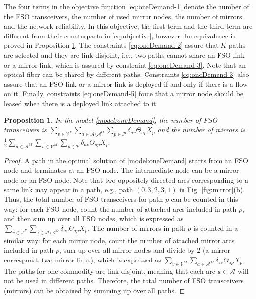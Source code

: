 \documentclass[onecolumn,11pt,draftclsnofoot]{IEEEtran}
\newtheorem{proposition}{Proposition}
\begin{document}
The four terms in the objective function \eqref{eq:oneDemand-1} denote the number of the FSO transceivers,  the number of used mirror nodes, the number of mirrors and the network reliability. In this objective, the first term and the third term are different from their counterparts in \eqref{eq:objective}, however the equivalence is proved in Proposition \ref{pp:oneDemand}.
The constraints \eqref{eq:oneDemand-2} assure that $K$ paths are selected and they are link-disjoint, i.e., two paths cannot share an FSO link or a mirror link, which is assured by constraint \eqref{eq:oneDemand-3}. Note that an optical fiber can be shared by different paths.
Constraints \eqref{eq:oneDemand-3} also assure that an FSO link or a mirror link is deployed if and only if there is a flow on it. Finally, constraints \eqref{eq:oneDemand-5} force that a mirror node should be leased when there is a deployed link attached to it.

\begin{proposition}\label{pp:oneDemand}
In the model \eqref{model:oneDemand}, the number of FSO transceivers is $\sum_{v \in \mathcal V^F}  \sum_{a \in  \mathcal A \setminus \mathcal A^O} \sum_{p \in \mathcal P}  \delta_{av} \Theta_{ap} X_{p} $ and the number of mirrors is $\frac{1}{2} \sum_{a \in \mathcal A^M}\sum_{v \in \mathcal V^M} \sum_{p \in \mathcal P}  \delta_{av} \Theta_{ap} X_p$. 
\end{proposition}
\begin{proof}
A path in the optimal solution of \eqref{model:oneDemand} starts from an FSO node and terminates at an FSO node. The intermediate node can be a mirror node or an FSO node. Note that two oppositely directed arcs corresponding to a same link may appear in a path, e.g., path $(0,3,2,3,1)$ in Fig. \ref{fig:mirror}(b). Thus, the total number of FSO transceivers for path $p$ can be counted in this way: for each FSO node, count the number of attached arcs included in path $p$, and then sum up over all FSO nodes, which is expressed  as $ \sum_{v \in \mathcal V^F}  \sum_{a \in  \mathcal A \setminus \mathcal A^O} \delta_{av} \Theta_{ap} X_{p} $. The number of mirrors in path $p$ is counted in a similar way: for each mirror node, count the number of attached mirror arcs included in path $p$, sum up over all mirror nodes and divide by 2 (a mirror corresponds two mirror links), which is expressed as $\sum_{v \in \mathcal V^M}  \sum_{a \in \mathcal A^M} \delta_{av} \Theta_{ap} X_p$. The paths for one commodity are link-disjoint, meaning that each arc $a \in \mathcal A$ will not be used in different paths. Therefore, the total number of FSO transceivers (mirrors) can be obtained by summing up over all paths.
\end{proof}
\end{document}
